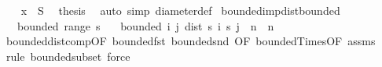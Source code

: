 \begin{isabellebody}
\ \ \isamarkupfalse%
\ {\isacartoucheopen}x\ {\isasymin}\ S{\isacartoucheclose}\ \isamarkupfalse%
\ {\isacharquery}{\kern0pt}thesis\ \isamarkupfalse%
\ {\isacharparenleft}{\kern0pt}auto\ simp{\isacharcolon}{\kern0pt}\ diameter{\isacharunderscore}{\kern0pt}def{\isacharparenright}{\kern0pt}\isanewline
{}\isamarkupfalse%
%
\endisatagproof
{\isafoldproof}%
%
\isadelimproof
\isanewline
%
\endisadelimproof
\isanewline
{}\isamarkupfalse%
\ bounded{\isacharunderscore}{\kern0pt}imp{\isacharunderscore}{\kern0pt}dist{\isacharunderscore}{\kern0pt}bounded{\isacharcolon}{\kern0pt}\isanewline
\ \ \ {\isachardoublequoteopen}bounded\ {\isacharparenleft}{\kern0pt}range\ s{\isacharparenright}{\kern0pt}{\isachardoublequoteclose}\isanewline
\ \ \ {\isachardoublequoteopen}bounded\ {\isacharparenleft}{\kern0pt}{\isacharparenleft}{\kern0pt}{\isasymlambda}{\isacharparenleft}{\kern0pt}i{\isacharcomma}{\kern0pt}\ j{\isacharparenright}{\kern0pt}{\isachardot}{\kern0pt}\ dist\ {\isacharparenleft}{\kern0pt}s\ i{\isacharparenright}{\kern0pt}\ {\isacharparenleft}{\kern0pt}s\ j{\isacharparenright}{\kern0pt}{\isacharparenright}{\kern0pt}\ {\isacharbackquote}{\kern0pt}\ {\isacharparenleft}{\kern0pt}{\isacharbraceleft}{\kern0pt}n{\isachardot}{\kern0pt}{\isachardot}{\kern0pt}{\isacharbraceright}{\kern0pt}\ {\isasymtimes}\ {\isacharbraceleft}{\kern0pt}n{\isachardot}{\kern0pt}{\isachardot}{\kern0pt}{\isacharbraceright}{\kern0pt}{\isacharparenright}{\kern0pt}{\isacharparenright}{\kern0pt}{\isachardoublequoteclose}\isanewline
%
\isadelimproof
\ \ %
\endisadelimproof
%
\isatagproof
{}\isamarkupfalse%
\ bounded{\isacharunderscore}{\kern0pt}dist{\isacharunderscore}{\kern0pt}comp{\isacharbrackleft}{\kern0pt}OF\ bounded{\isacharunderscore}{\kern0pt}fst\ bounded{\isacharunderscore}{\kern0pt}snd{\isacharcomma}{\kern0pt}\ OF\ bounded{\isacharunderscore}{\kern0pt}Times{\isacharparenleft}{\kern0pt}{}{\isacharcomma}{\kern0pt}{}{\isacharparenright}{\kern0pt}{\isacharbrackleft}{\kern0pt}OF\ assms{\isacharparenleft}{\kern0pt}{}{\isacharcomma}{\kern0pt}{}{\isacharparenright}{\kern0pt}{\isacharbrackright}{\kern0pt}{\isacharbrackright}{\kern0pt}\ \isamarkupfalse%
\ {\isacharparenleft}{\kern0pt}rule\ bounded{\isacharunderscore}{\kern0pt}subset{\isacharcomma}{\kern0pt}\ force{\isacharparenright}{\kern0pt}%
\endisatagproof
{\isafoldproof}%
%
\isadelimproof
\ \isanewline
%
\endisadelimproof
\isanewline
{}\isamarkupfalse%

\end{isabellebody}
